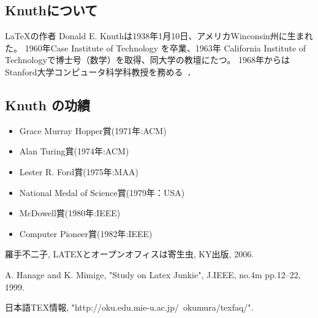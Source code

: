 \documentclass[a4j]{jarticle}
\begin{document}
\subsection{Knuthについて}

\LaTeX の作者 Donald E. Knuthは1938年1月10日、アメリカWinconsin州に生まれた。
1960年Case Institute of Technology を卒業、1963年 California Institute of Technologyで博士号（数学）を取得、同大学の教壇にたつ。
1968年からはStanford大学コンピュータ科学科教授を務める~\cite{W3TEX}．

\subsection{Knuth の功績}

\begin{itemize}
\item Grace Murray Hopper賞(1971年:ACM)

\item Alan Turing賞(1974年:ACM)

\item Lester R. Ford賞(1975年:MAA)

\item National Medal of Science賞(1979年：USA)

\item McDowell賞(1980年:IEEE)

\item Computer Pioneer賞(1982年:IEEE)
\end{itemize}

\begin{thebibliography}{99}

羅手不二子, LATEXとオープンオフィスは寄生虫, KY出版, 2006.

A. Hanage and K. Mimige, "Study on Latex Junkie", J.IEEE, no.4m pp.12--22, 1999.

日本語TEX情報, "http://oku.edu.mie-u.ac.jp/~okumura/texfaq/".

\end{thebibliography}
\end{document}
